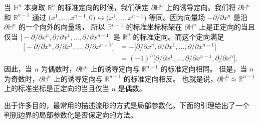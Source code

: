 \begin{example}
  当 $\mathbb{H}^n$ 本身取 $\mathbb{R}^n$ 的标准定向的时候，我们确定
  $\partial \mathbb{H}^n$ 上的诱导定向。我们将 $\partial \mathbb{H}^n$
  和 $\mathbb{R}^{n-1}$ 通过 $\bigl(x^1,\dots,x^{n-1},0\bigr)\leftrightarrow \bigl(x^1,\dots,x^{n-1}\bigr)$
  等同。因为向量场 $-\partial/\partial x^n$ 是沿 $\partial \mathbb{H}^n$ 的一个向外的向量场，
  所以 $\mathbb{R}^{n-1}$ 的标准坐标标架在 $\partial \mathbb{H}^n$ 上是正定向的当且仅当
  $\bigl[-\partial/\partial x^n,\partial/\partial x^1,\dots,\partial/\partial x^{n-1}\bigr]$
  是 $\mathbb{R}^n$ 的标准定向。而这个定向满足
  \begin{align*}
    \bigl[-\partial/\partial x^n,\partial/\partial x^1,\dots,\partial/\partial x^{n-1}\bigr]
    &=-\bigl[\partial/\partial x^n,\partial/\partial x^1,\dots,\partial/\partial x^{n-1}\bigr]\\
    &=(-1)^n\bigl[\partial/\partial x^1,\dots,\partial/\partial x^{n-1},\partial/\partial x^n\bigr].
  \end{align*}
  因此，当 $n$ 为偶数时，$\partial \mathbb{H}^n$ 上的诱导定向与 $\mathbb{R}^{n-1}$ 的标准定向相同。
  但是，当 $n$ 为奇数时，$\partial \mathbb{H}^n$ 上的诱导定向与 $\mathbb{R}^{n-1}$ 的标准定向相反。
  也就是说，$\partial \mathbb{H}^n\approx \mathbb{R}^{n-1}$ 上的标准坐标是正定向的当且仅当 $n$ 是偶数。
\end{example}

出于许多目的，最常用的描述流形的方式是局部参数化。下面的引理给出了一个
判别边界的局部参数化是否保定向的方法。

